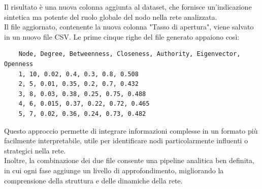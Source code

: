 \documentclass[12pt]{article}
\begin{document}
	Il risultato è una nuova colonna aggiunta al dataset, che fornisce un'indicazione sintetica ma potente del ruolo globale del nodo nella rete analizzata.\\
	Il file aggiornato, contenente la nuova colonna "Tasso di apertura", viene salvato in un nuovo file CSV.
	Le prime cinque righe del file generato appaiono così:
	\begin{lstlisting}
	Node, Degree, Betweenness, Closeness, Authority, Eigenvector, Openness
	1, 10, 0.02, 0.4, 0.3, 0.8, 0.508
	2, 5, 0.01, 0.35, 0.2, 0.7, 0.432
	3, 8, 0.03, 0.38, 0.25, 0.75, 0.488
	4, 6, 0.015, 0.37, 0.22, 0.72, 0.465
	5, 7, 0.02, 0.36, 0.24, 0.73, 0.482
	\end{lstlisting}
	Questo approccio permette di integrare informazioni complesse in un formato più facilmente interpretabile, utile per identificare nodi particolarmente influenti o strategici nella rete. \\Inoltre, la combinazione dei due file consente una pipeline analitica ben definita, in cui ogni fase aggiunge un livello di approfondimento, migliorando la comprensione della struttura e delle dinamiche della rete.
\end{document}
